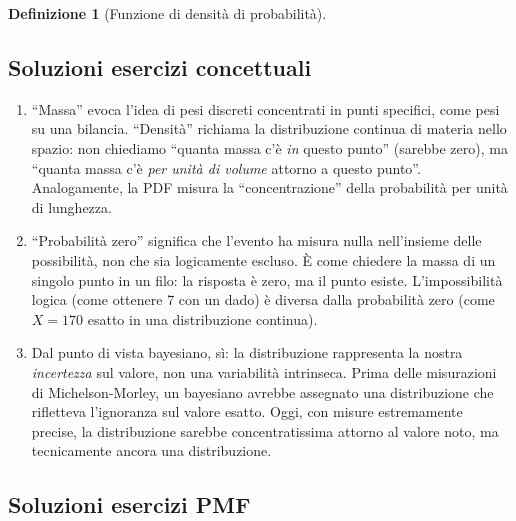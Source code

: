 \documentclass[
  italian,
  letterpaper,
  a4paper,
  11pt,
  open=any]{scrbook}
\theoremstyle{plain}
\theoremstyle{definition}
\theoremstyle{definition}
\newtheorem{definition}{Definizione}[chapter]
\theoremstyle{remark}
\begin{document}
\begin{definition}[Funzione di densità di
probabilità]
\begin{tcolorbox}[enhanced jigsaw, arc=.35mm, bottomrule=.15mm, bottomtitle=1mm, breakable, colback=white, colbacktitle=quarto-callout-tip-color!10!white, colframe=quarto-callout-tip-color-frame, coltitle=black, left=2mm, leftrule=.75mm, opacityback=0, opacitybacktitle=0.6, rightrule=.15mm, title=\textcolor{quarto-callout-tip-color}{\faLightbulb}\hspace{0.5em}{Soluzioni}, titlerule=0mm, toprule=.15mm, toptitle=1mm]

\subsection*{Soluzioni esercizi
concettuali}\label{soluzioni-esercizi-concettuali}

\begin{enumerate}
\def\labelenumi{\arabic{enumi}.}
\item
  ``Massa'' evoca l'idea di pesi discreti concentrati in punti
  specifici, come pesi su una bilancia. ``Densità'' richiama la
  distribuzione continua di materia nello spazio: non chiediamo ``quanta
  massa c'è \emph{in} questo punto'' (sarebbe zero), ma ``quanta massa
  c'è \emph{per unità di volume} attorno a questo punto''. Analogamente,
  la PDF misura la ``concentrazione'' della probabilità per unità di
  lunghezza.
\item
  ``Probabilità zero'' significa che l'evento ha misura nulla
  nell'insieme delle possibilità, non che sia logicamente escluso. È
  come chiedere la massa di un singolo punto in un filo: la risposta è
  zero, ma il punto esiste. L'impossibilità logica (come ottenere 7 con
  un dado) è diversa dalla probabilità zero (come \(X = 170\) esatto in
  una distribuzione continua).
\item
  Dal punto di vista bayesiano, sì: la distribuzione rappresenta la
  nostra \emph{incertezza} sul valore, non una variabilità intrinseca.
  Prima delle misurazioni di Michelson-Morley, un bayesiano avrebbe
  assegnato una distribuzione che rifletteva l'ignoranza sul valore
  esatto. Oggi, con misure estremamente precise, la distribuzione
  sarebbe concentratissima attorno al valore noto, ma tecnicamente
  ancora una distribuzione.
\end{enumerate}

\subsection*{Soluzioni esercizi PMF}\label{soluzioni-esercizi-pmf}


\end{tcolorbox}
\end{definition}
\end{document}
